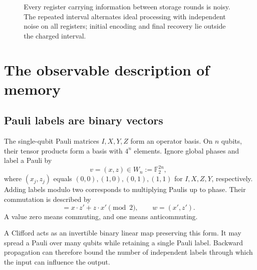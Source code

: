 \documentclass[11pt,a4paper]{article}
\numberwithin{equation}{section}
\theoremstyle{remark}\newtheorem*{remark}{Interpretation}
\newcommand{\F}{\mathbb F_2}
\begin{document}
\begin{figure}[ht]
\centering
{}
\caption{Every register carrying information between storage rounds is noisy. The repeated interval alternates ideal processing with independent noise on all registers; initial encoding and final recovery lie outside the charged interval.}
\end{figure}

\section{The observable description of memory}
\subsection{Pauli labels are binary vectors}
The single-qubit Pauli matrices $I,X,Y,Z$ form an operator basis. On $n$ qubits, their tensor products form a basis with $4^n$ elements. Ignore global phases and label a Pauli by
\begin{equation}
v=(x,z)\in W_n:=\F^{2n},
\end{equation}
where $(x_j,z_j)$ equals $(0,0),(1,0),(0,1),(1,1)$ for $I,X,Z,Y$, respectively. Adding labels modulo two corresponds to multiplying Paulis up to phase. Their commutation is described by
\begin{equation}
[v,w]=x\cdot z'+z\cdot x'\pmod2,
\qquad w=(x',z').
\end{equation}
A value zero means commuting, and one means anticommuting.

A Clifford acts as an invertible binary linear map preserving this form. It may spread a Pauli over many qubits while retaining a single Pauli label. Backward propagation can therefore bound the number of independent labels through which the input can influence the output.
\end{document}
